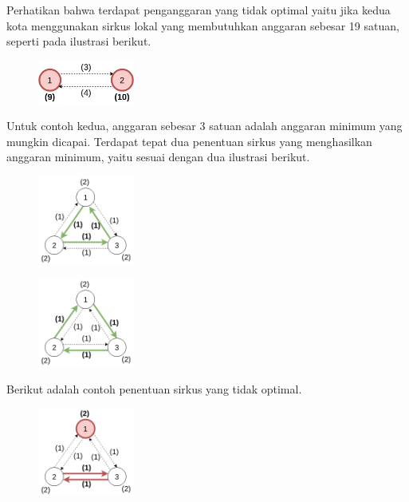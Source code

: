 \documentclass[../main_problemset.tex]{subfiles} %
\begin{document}
Perhatikan bahwa terdapat penganggaran yang tidak optimal yaitu jika kedua kota menggunakan sirkus lokal yang membutuhkan anggaran sebesar 19 satuan, seperti pada ilustrasi berikut.

\begin{figure}[H]
	\centering
	\includegraphics[width=120px]{bis-ddak/asset/Sample_1_NOT_OK}
\end{figure}

Untuk contoh kedua, anggaran sebesar 3 satuan adalah anggaran minimum yang mungkin dicapai. Terdapat tepat dua penentuan sirkus yang menghasilkan anggaran minimum, yaitu sesuai dengan dua ilustrasi berikut.

\vspace{-0.8cm}
\begin{minipage}[t]{0.5\textwidth}
\begin{figure}[H]
	\centering
	\includegraphics[width=120px]{bis-ddak/asset/Sample_2_OK_1}
\end{figure}
\end{minipage}
\begin{minipage}[t]{0.5\textwidth}
\begin{figure}[H]
	\centering
	\includegraphics[width=120px]{bis-ddak/asset/Sample_2_OK_2}
\end{figure}
\end{minipage}
\vspace{0.1cm}

Berikut adalah contoh penentuan sirkus yang tidak optimal.

\begin{figure}[H]
	\centering
	\includegraphics[width=120px]{bis-ddak/asset/Sample_2_NOT_OK}
\end{figure}
\end{document}
